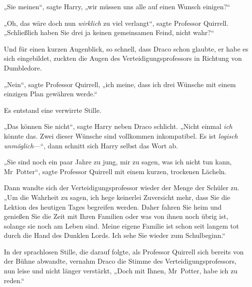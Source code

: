 „Sie meinen“, sagte Harry, „wir müssen uns alle auf einen Wunsch einigen?“

„Oh, das wäre doch nun \emph{wirklich} zu viel verlangt“, sagte Professor Quirrell. „Schließlich haben Sie drei ja keinen gemeinsamen Feind, nicht wahr?“

Und für einen kurzen Augenblick, so schnell, dass Draco schon glaubte, er habe es sich eingebildet, zuckten die Augen des Verteidigungsprofessors in Richtung von Dumbledore.

„Nein“, sagte Professor Quirrell, „ich meine, dass ich drei Wünsche mit einem einzigen Plan gewähren werde.“

Es entstand eine verwirrte Stille.

„Das können Sie nicht“, sagte Harry neben Draco schlicht. „Nicht einmal \emph{ich} könnte das. Zwei dieser Wünsche sind vollkommen inkompatibel. Es ist \emph{logisch unmöglich}—“, dann schnitt sich Harry selbst das Wort ab.

„Sie sind noch ein paar Jahre zu jung, mir zu sagen, was ich nicht tun kann, Mr~Potter“, sagte Professor Quirrell mit einem kurzen, trockenen Lächeln.

Dann wandte sich der Verteidigungsprofessor wieder der Menge der Schüler zu. „Um die Wahrheit zu sagen, ich hege keinerlei Zuversicht mehr, dass Sie die Lektion des heutigen Tages begreifen werden. Daher fahren Sie heim und genießen Sie die Zeit mit Ihren Familien oder was von ihnen noch übrig ist, solange sie noch am Leben sind. Meine eigene Familie ist schon seit langem tot durch die Hand des Dunklen Lords. Ich sehe Sie wieder zum Schulbeginn.“

In der sprachlosen Stille, die darauf folgte, als Professor Quirrell sich bereits von der Bühne abwandte, vernahm Draco die Stimme des Verteidigungsprofessors, nun leise und nicht länger verstärkt, „Doch mit Ihnen, Mr~Potter, habe ich zu reden.“


